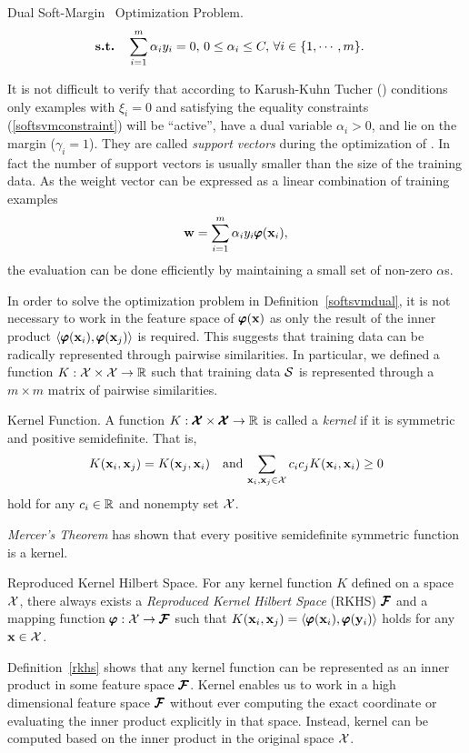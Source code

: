 {\begin{definition}{Dual Soft-Margin \svm\ Optimization Problem.}
\begin{align*}
		\textbf{s.t.} & \quad \sum_{i=1}^{m}\alpha_iy_i=0, \, 0\le\alpha_i\le C, \, \forall i\in\{1,\cdots,m\}.
	\end{align*}
\end{definition}
\noindent
It is not difficult to verify that according to Karush-Kuhn Tucher (\kkt) conditions only examples with $\xi_i=0$ and satisfying the equality constraints (\ref{softsvmconstraint}) will be ``active'', have a dual variable $\alpha_i>0$, and lie on the margin ($\gamma_i=1$).
They are called \textit{support vectors} during the optimization of \svm.
In fact the number of support vectors is usually smaller than the size of the training data.
As the weight vector can be expressed as a linear combination of training examples \citep{taylor04}
\begin{align*}
	\mathbf {w} = \sum_{i=1}^{m}\alpha_iy_i\pmb \varphi(\mathbf {x}_i),
\end{align*}
the evaluation can be done efficiently by maintaining a small set of non-zero $\alpha$s.

In order to solve the optimization problem in Definition~\ref{softsvmdual}, it is not necessary to work in the feature space of $\pmb \varphi(\mathbf {x})$ as only the result of the inner product $\langle \pmb \varphi(\mathbf {x}_i), \pmb \varphi(\mathbf {x}_j) \rangle$ is required.
This suggests that training data can be radically represented through pairwise similarities.
In particular, we defined a function $K:\mathcal{X}\times\mathcal{X}\rightarrow\mathbb{R}$ such that training data $\mathcal{S}$ is represented through a $m\times m$ matrix of pairwise similarities.
\begin{definition}{Kernel Function.}
 	A function $K:\pmb {\mathcal{X}}\times\pmb {\mathcal{X}}\rightarrow\mathbb{R}$ is called a \textit{kernel} if it is symmetric and positive semidefinite. That is, 
\begin{align*}
	K(\mathbf {x}_i,\mathbf {x}_j) = K(\mathbf {x}_j,\mathbf {x}_i)\quad \text{and}\, \sum_{\mathbf {x}_i,\mathbf {x}_j\in\mathcal{X}}c_ic_jK(\mathbf {x}_i,\mathbf {x}_i)\ge0
\end{align*}
hold for any $c_i\in\mathbb{R}$ and nonempty set $\mathcal{X}$.
\end{definition}
\noindent
\textit{Mercer's Theorem} \citep{taylor04} has shown that every positive semidefinite symmetric function is a kernel.
\begin{definition}{Reproduced Kernel Hilbert Space.} \label{rkhs}
	For any kernel function $K$ defined on a space $\mathcal{X}$, there always exists a \textit{Reproduced Kernel Hilbert Space} (RKHS) $\pmb {\mathcal{F}}$ and a mapping function $\pmb \varphi:\mathcal{X}\rightarrow\pmb {\mathcal{F}}$ such that $K(\mathbf {x}_i,\mathbf {x}_j)=\langle \pmb \varphi(\mathbf {x}_i), \pmb \varphi(\mathbf {y}_i) \rangle$ holds for any $\mathbf {x}\in\mathcal{X}$.
\end{definition}
\noindent
Definition~\ref{rkhs} shows that any kernel function can be represented as an inner product in some feature space $\pmb {\mathcal{F}}$.
Kernel enables us to work in a high dimensional feature space $\pmb {\mathcal{F}}$ without ever computing the exact coordinate or evaluating the inner product explicitly in that space.
Instead, kernel can be computed based on the inner product in the original space $\mathcal{X}$.

}
